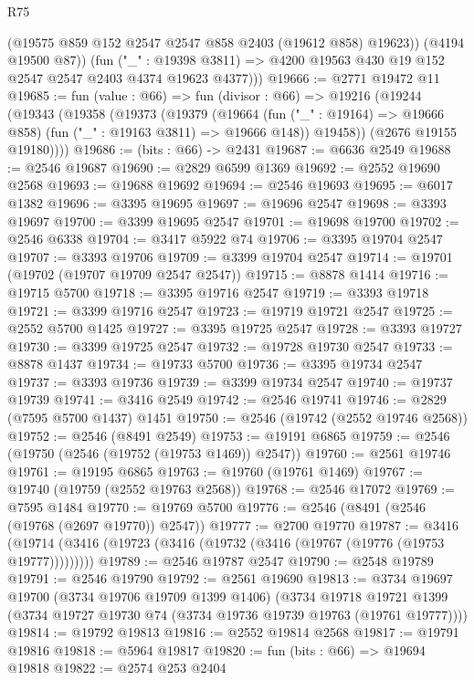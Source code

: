 \begin{lexlean}{R75}
\begin{coremodule}
            (@19575 @859 @152 @2547 @2547 @858 @2403 (@19612 @858) @19623))
          (@4194 @19500 @87))
        (fun ("_" : @19398 @3811) =>
        @4200 @19563 @430 @19 @152 @2547 @2547 @2403 @4374 @19623 @4377)))
@19666 := @2771 @19472 @11
@19685 := fun (value : @66) =>
  fun (divisor : @66) =>
  @19216
    (@19244
      (@19343
        (@19358
          (@19373
            (@19379
              (@19664 (fun ("_" : @19164) => @19666 @858) (fun ("_" : @19163 @3811) => @19666 @148))
              @19458))
          (@2676 @19155 @19180))))
@19686 := (bits : @66) -> @2431
@19687 := @6636 @2549
@19688 := @2546 @19687
@19690 := @2829 @6599 @1369
@19692 := @2552 @19690 @2568
@19693 := @19688 @19692
@19694 := @2546 @19693
@19695 := @6017 @1382
@19696 := @3395 @19695
@19697 := @19696 @2547
@19698 := @3393 @19697
@19700 := @3399 @19695 @2547
@19701 := @19698 @19700
@19702 := @2546 @6338
@19704 := @3417 @5922 @74
@19706 := @3395 @19704 @2547
@19707 := @3393 @19706
@19709 := @3399 @19704 @2547
@19714 := @19701 (@19702 (@19707 @19709 @2547 @2547))
@19715 := @8878 @1414
@19716 := @19715 @5700
@19718 := @3395 @19716 @2547
@19719 := @3393 @19718
@19721 := @3399 @19716 @2547
@19723 := @19719 @19721 @2547
@19725 := @2552 @5700 @1425
@19727 := @3395 @19725 @2547
@19728 := @3393 @19727
@19730 := @3399 @19725 @2547
@19732 := @19728 @19730 @2547
@19733 := @8878 @1437
@19734 := @19733 @5700
@19736 := @3395 @19734 @2547
@19737 := @3393 @19736
@19739 := @3399 @19734 @2547
@19740 := @19737 @19739
@19741 := @3416 @2549
@19742 := @2546 @19741
@19746 := @2829 (@7595 @5700 @1437) @1451
@19750 := @2546 (@19742 (@2552 @19746 @2568))
@19752 := @2546 (@8491 @2549)
@19753 := @19191 @6865
@19759 := @2546 (@19750 (@2546 (@19752 (@19753 @1469)) @2547))
@19760 := @2561 @19746
@19761 := @19195 @6865
@19763 := @19760 (@19761 @1469)
@19767 := @19740 (@19759 (@2552 @19763 @2568))
@19768 := @2546 @17072
@19769 := @7595 @1484
@19770 := @19769 @5700
@19776 := @2546 (@8491 (@2546 (@19768 (@2697 @19770)) @2547))
@19777 := @2700 @19770
@19787 := @3416 (@19714 (@3416 (@19723 (@3416 (@19732 (@3416 (@19767 (@19776 (@19753 @19777)))))))))
@19789 := @2546 @19787 @2547
@19790 := @2548 @19789
@19791 := @2546 @19790
@19792 := @2561 @19690
@19813 := @3734
    @19697
    @19700
    (@3734 @19706 @19709 @1399 @1406)
    (@3734
      @19718
      @19721
      @1399
      (@3734 @19727 @19730 @74 (@3734 @19736 @19739 @19763 (@19761 @19777))))
@19814 := @19792 @19813
@19816 := @2552 @19814 @2568
@19817 := @19791 @19816
@19818 := @5964 @19817
@19820 := fun (bits : @66) => @19694 @19818
@19822 := @2574 @253 @2404

\end{coremodule}
\end{lexlean}
